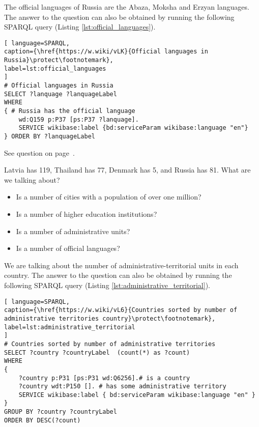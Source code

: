 The official languages of Russia are the Abaza, Moksha and Erzyan languages. The answer to the question can also be obtained by running the following SPARQL query (Listing \ref{lst:official_languages}).

\begin{lstlisting}[ language=SPARQL, 
caption={\href{https://w.wiki/vLK}{Official languages in Russia}\protect\footnotemark},
label=lst:official_languages
]
# Official languages in Russia
SELECT ?lanquage ?lanquageLabel
WHERE
{ # Russia has the official language
	wd:Q159 p:P37 [ps:P37 ?lanquage].
	SERVICE wikibase:label {bd:serviceParam wikibase:language "en"}
} ORDER BY ?lanquageLabel
\end{lstlisting}

See question on page~\pageref{question:official_language}.
\begin{exercise}
\label{answer:administrative_territorial}

Latvia has 119, Thailand has 77, Denmark has 5, and Russia has 81. What are we talking about?
\begin{itemize}
\item Is a number of cities with a population of over one million?
\item Is a number of higher education institutions?
\item Is a number of administrative units?
\item Is a number of official languages?
\end{itemize}

\end{exercise}

We are talking about the number of administrative-territorial units in each country. The answer to the question can also be obtained by running the following SPARQL query (Listing \ref{lst:administrative_territorial}).

\begin{lstlisting}[ language=SPARQL, 
caption={\href{https://w.wiki/vL6}{Countries sorted by number of administrative territories country}\protect\footnotemark},
label=lst:administrative_territorial
]
# Countries sorted by number of administrative territories
SELECT ?country ?countryLabel  (count(*) as ?count)
WHERE
{
	?country p:P31 [ps:P31 wd:Q6256].# is a country
	?country wdt:P150 []. # has some administrative territory
	SERVICE wikibase:label { bd:serviceParam wikibase:language "en" }
}
GROUP BY ?country ?countryLabel
ORDER BY DESC(?count)
\end{lstlisting}

